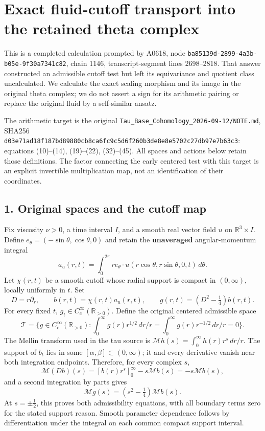 \section{Exact fluid-cutoff transport into the retained theta
complex}\label{proof09:exact-fluid-cutoff-transport-into-the-retained-theta-complex}

This is a completed calculation prompted by A0618, node
\texttt{ba85139d-\allowbreak{}2899-\allowbreak{}4a3b-\allowbreak{}b05e-\allowbreak{}9f30a7341c82}, chain 1146,
transcript-segment lines 2698--2818. That answer constructed an
admissible cutoff test but left its equivariance and quotient class
uncalculated. We calculate the exact scaling morphism and its image in
the original theta complex; we do not assert a sign for its arithmetic
pairing or replace the original fluid by a self-similar ansatz.

The arithmetic target is the original
\texttt{Tau\_\allowbreak{}Base\_\allowbreak{}Cohomology\_\allowbreak{}2026-\allowbreak{}09-\allowbreak{}12/\allowbreak{}NOTE.md}, SHA256
\texttt{d03e71ad\allowbreak{}18f187bd\allowbreak{}89880cb8\allowbreak{}ca6fc9c5\allowbreak{}d6f260b3\allowbreak{}de8e8e57\allowbreak{}02c27db9\allowbreak{}7e7b63c3}:
equations (10)--(14), (19)--(22), (32)--(45). All spaces and actions
below retain those definitions. The factor connecting the early centered
test with this target is an explicit invertible multiplication map, not
an identification of their coordinates.

\subsection{1. Original spaces and the cutoff
map}\label{proof09:original-spaces-and-the-cutoff-map}

Fix viscosity \(\nu>0\), a time interval \(I\), and a smooth real vector
field \(u\) on \(\mathbb R^3\times I\). Define
\(e_\theta=(-\sin\theta,\cos\theta,0)\) and retain the
\textbf{unaveraged} angular-momentum integral \[
a_u(r,t)=\int_0^{2\pi}r e_\theta\cdot u(r\cos\theta,r\sin\theta,0,t)\,d\theta.
\] Let \(\chi(r,t)\) be a smooth cutoff whose radial support is compact
in \((0,\infty)\), locally uniformly in \(t\). Set \[
D=r\partial_r,\qquad b(r,t)=\chi(r,t)a_u(r,t),\qquad
g(r,t)=(D^2-\tfrac14)b(r,t).
\] For every fixed \(t\), \(g_t\in C_c^\infty(\mathbb R_{>0})\). Define
the original centered admissible space \[
\mathscr T=\{g\in C_c^\infty(\mathbb R_{>0}):\int_0^\infty g(r)r^{1/2}\,dr/r=\int_0^\infty g(r)r^{-1/2}\,dr/r=0\}.
\] The Mellin transform used in the tau source is
\(\mathcal M h(s)=\int_0^\infty h(r)r^s\,dr/r\). The support of \(b_t\)
lies in some \([\alpha,\beta]\subset(0,\infty)\); it and every
derivative vanish near both integration endpoints. Therefore, for every
complex \(s\), \[
\mathcal M(Db)(s)=[b(r)r^s]_0^\infty-s\mathcal Mb(s)=-s\mathcal Mb(s),
\] and a second integration by parts gives \[
\mathcal Mg(s)=(s^2-\tfrac14)\mathcal Mb(s).
\tag{1}
\] At \(s=\pm\tfrac12\), this proves both admissibility equations, with
all boundary terms zero for the stated support reason. Smooth parameter
dependence follows by differentiation under the integral on each common
compact support interval.

